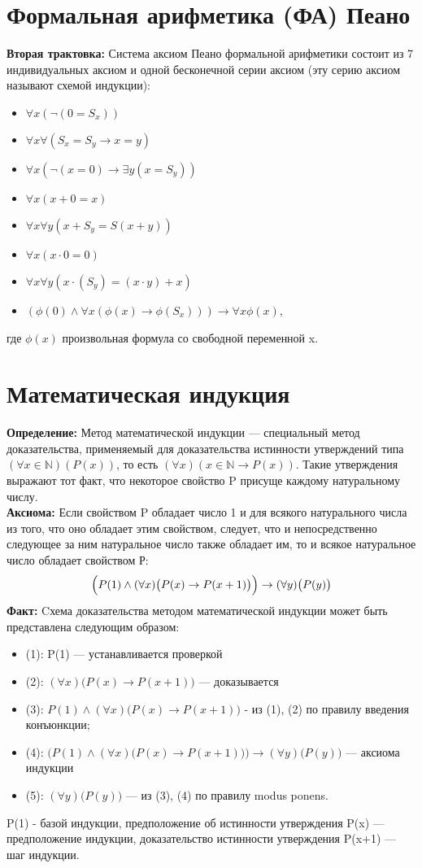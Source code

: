 \documentclass[../main.tex]{subfiles}
\begin{document}
\section{Формальная арифметика (ФА) Пеано
}
\textbf{Вторая трактовка:
} Система аксиом Пеано формальной арифметики состоит из 7 индивидуальных аксиом и одной бесконечной серии аксиом (эту серию аксиом называют схемой индукции):
\begin{itemize}
	\item $\forall x(\lnot(0 = S_x))$
	\item $\forall x \forall (S_x = S_y \to x = y)$
	\item $\forall x(\lnot (x = 0) \to \exists y(x = S_y))$
	\item $\forall x(x + 0 = x)$
	\item $\forall x \forall y(x + S_y = S(x + y))$
	\item $\forall x(x \cdot  0 = 0)$
	\item $\forall x \forall y(x \cdot (S_y) = (x \cdot y) + x)$
	\item $(\phi (0) \land \forall x(\phi (x) \to \phi (S_x))) \to \forall x \phi (x)$,
\end{itemize}
где $\phi (x)$ произвольная формула со свободной переменной x.

\section{Математическая индукция}
\textbf{Определение:
} Метод математической индукции — специальный метод доказательства, применяемый для доказательства истинности утверждений типа $(\forall x\in \mathbb{N})(P(x))$, то есть $(\forall x)(x\in \mathbb{N}\to P(x))$. Такие утверждения выражают тот факт, что некоторое свойство P присуще каждому натуральному числу. \\
\textbf{Аксиома:
} Если свойством P обладает число 1 и для всякого натурального числа из того, что оно обладает этим свойством, следует, что и непосредственно следующее за ним натуральное число также обладает им, то и всякое натуральное число обладает свойством Р:
\[\Bigl(P(1)\land (\forall x)\bigl(P(x)\to P(x+1)\bigr)\Bigr)\to (\forall y)\bigl(P(y)\bigr)\]
\textbf{Факт:
} Cхема доказательства методом математической индукции может быть представлена следующим образом:
\begin{itemize}
	\item (1): P(1) — устанавливается проверкой
	\item (2): $(\forall x)\bigl(P(x)\to P(x+1)\bigr)$ — доказывается
	\item (3): $P(1)\land (\forall x)\bigl(P(x)\to P(x+1)\bigr)$ - из (1), (2) по правилу введения конъюнкции;
	\item (4): $\bigl(P(1)\land (\forall x)\bigl(P(x)\to P(x+1)\bigr)\bigr)\to (\forall y)\bigl(P(y)\bigr)$ — аксиома индукции
	\item (5): $(\forall y)\bigl(P(y)\bigr)$ — из (3), (4) по правилу modus ponens.
\end{itemize}
P(1) - базой индукции, предположение об истинности утверждения P(x) — предположение индукции, доказательство истинности утверждения P(x+1) — шаг индукции.
\end{document}
